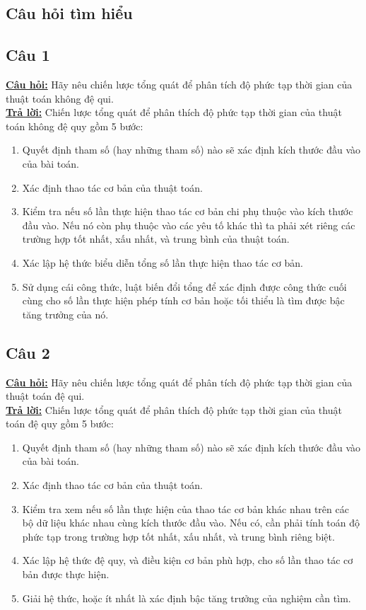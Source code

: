 \documentclass[a4paper 14pt]{extarticle}
\begin{document}
	
	\pagebreak
	
	\begin{flushleft}
		\section{Câu hỏi tìm hiểu}
		\subsection{Câu 1}
		\underline{\textbf{Câu hỏi:}} Hãy nêu chiến lược tổng quát để phân tích độ phức tạp thời gian của thuật toán không đệ qui.\\
		\underline{\textbf{Trả lời:}} Chiến lược tổng quát để phân thích độ phức tạp thời gian của thuật toán không đệ quy gồm 5 bước:
		\begin{enumerate}
			\item Quyết định tham số (hay những tham số) nào sẽ xác định kích thước đầu vào của bài toán.
			\item Xác định thao tác cơ bản của thuật toán.
			\item Kiểm tra nếu số lần thực hiện thao tác cơ bản chi phụ thuộc vào kích thước đầu vào. Nếu nó còn phụ thuộc vào các yêu tố khác thì ta phải xét riêng các trường hợp tốt nhất, xấu nhất, và trung bình của thuật toán.
			\item Xác lập hệ thức biểu diễn tổng số lần thực hiện thao tác cơ bản.
			\item Sử dụng cái công thức, luật biến đổi tổng để xác định được công thức cuối cùng cho số lần thực hiện phép tính cơ bản hoặc tối thiểu là tìm được bậc tăng trưởng của nó.
		\end{enumerate}
		\subsection{Câu 2}
		\underline{\textbf{Câu hỏi:}} Hãy nêu chiến lược tổng quát để phân tích độ phức tạp thời gian của thuật toán đệ qui.\\
		\underline{\textbf{Trả lời:}} Chiến lược tổng quát để phân thích độ phức tạp thời gian của thuật toán đệ quy gồm 5 bước: \\
		\begin{enumerate}
			\item Quyết định tham số (hay những tham số) nào sẽ xác định kích thước đầu vào của bài toán.
			\item Xác định thao tác cơ bản của thuật toán.
			\item Kiểm tra xem nếu số lần thực hiện của thao tác cơ bản khác nhau trên các bộ dữ liệu khác nhau cùng kích thước đầu vào. Nếu có, cần phải tính toán độ phức tạp trong trường hợp tốt nhất, xấu nhất, và trung bình riêng biệt.
			\item Xác lập hệ thức đệ quy, và điều kiện cơ bản phù hợp, cho số lần thao tác cơ bản được thực hiện.
			\item Giải hệ thức, hoặc ít nhất là xác định bậc tăng trưởng của nghiệm cần tìm.
		\end{enumerate}
		

\end{flushleft}
\end{document}

